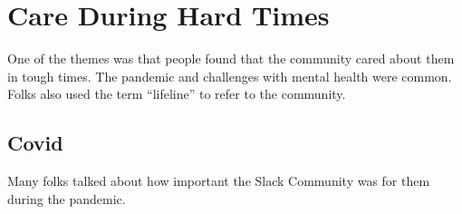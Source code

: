 \documentclass[
]{book}
\begin{document}
\section{Care During Hard Times}\label{care-during-hard-times}

One of the themes was that people found that the community cared about them in tough times. The pandemic and challenges with mental health were common. Folks also used the term ``lifeline'' to refer to the community.

\subsection{Covid}\label{covid}

Many folks talked about how important the Slack Community was for them during the pandemic.
\end{document}
